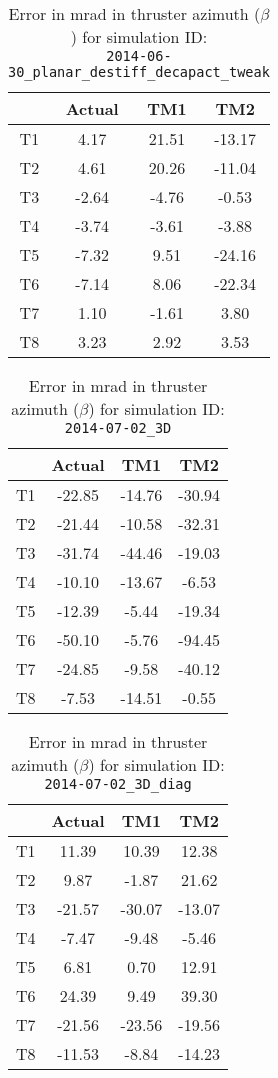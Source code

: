 \begin{table}[H]
\centering
\cprotect\caption{Error in mrad in thruster azimuth ($\beta$) for simulation ID:\\
\verb|2014-06-30_planar_destiff_decapact_tweak|}
\begin{tabular}{|c|c|c|c|} \hline
~ & Actual & TM1 & TM2 \\ \hline
T1 & 4.17 & 21.51 & -13.17 \\
T2 & 4.61 & 20.26 & -11.04 \\
T3 & -2.64 & -4.76 & -0.53 \\
T4 & -3.74 & -3.61 & -3.88 \\
T5 & -7.32 & 9.51 & -24.16 \\
T6 & -7.14 & 8.06 & -22.34 \\
T7 & 1.10 & -1.61 & 3.80 \\
T8 & 3.23 & 2.92 & 3.53 \\ \hline
\end{tabular}
\label{beta-4}
\end{table}

\begin{table}[H]
\centering
\cprotect\caption{Error in mrad in thruster azimuth ($\beta$) for simulation ID:\\
\verb|2014-07-02_3D|}
\begin{tabular}{|c|c|c|c|} \hline
~ & Actual & TM1 & TM2 \\ \hline
T1 & -22.85 & -14.76 & -30.94 \\
T2 & -21.44 & -10.58 & -32.31 \\
T3 & -31.74 & -44.46 & -19.03 \\
T4 & -10.10 & -13.67 & -6.53 \\
T5 & -12.39 & -5.44 & -19.34 \\
T6 & -50.10 & -5.76 & -94.45 \\
T7 & -24.85 & -9.58 & -40.12 \\
T8 & -7.53 & -14.51 & -0.55 \\ \hline
\end{tabular}
\label{beta-5}
\end{table}

\begin{table}[H]
\centering
\cprotect\caption{Error in mrad in thruster azimuth ($\beta$) for simulation ID:\\
\verb|2014-07-02_3D_diag|}
\begin{tabular}{|c|c|c|c|} \hline
~ & Actual & TM1 & TM2 \\ \hline
T1 & 11.39 & 10.39 & 12.38 \\
T2 & 9.87 & -1.87 & 21.62 \\
T3 & -21.57 & -30.07 & -13.07 \\
T4 & -7.47 & -9.48 & -5.46 \\
T5 & 6.81 & 0.70 & 12.91 \\
T6 & 24.39 & 9.49 & 39.30 \\
T7 & -21.56 & -23.56 & -19.56 \\
T8 & -11.53 & -8.84 & -14.23 \\ \hline
\end{tabular}
\label{beta-6}
\end{table}

